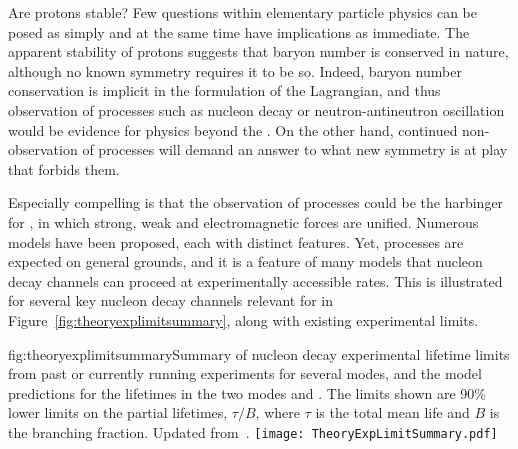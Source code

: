 Are protons %
stable? Few questions within elementary 
particle physics can be posed as simply and at the same time 
have implications as immediate.  The 
apparent stability of protons suggests that baryon number 
is conserved in nature, although no known symmetry 
requires it to be so.  Indeed, baryon number conservation is 
implicit in the formulation of the  Lagrangian, and 
thus observation of  processes such 
as nucleon decay or neutron-antineutron oscillation 
would be evidence for physics beyond the .
On the other hand, continued non-observation of  processes will 
demand an answer to what new symmetry is at play that forbids 
them.
 
Especially compelling is that the observation of  processes 
could be the harbinger for , in which strong, weak and 
electromagnetic forces are unified.  Numerous  models 
have been proposed, each with distinct features.  Yet,  processes 
are expected on general grounds, and it is a feature of many models 
that nucleon decay channels can proceed at experimentally 
accessible rates.  This is illustrated for several key nucleon 
decay channels relevant for  in 
Figure~\ref{fig:theoryexplimitsummary}, along with existing 
experimental limits.

\begin{dunefigure}{fig:theoryexplimitsummary}{Summary of nucleon decay experimental lifetime limits from past or currently running experiments for several modes, and the model predictions for the lifetimes in the two modes \ptoepizero and \ptoknubar.  The limits shown are 90\%  lower limits on the partial lifetimes, $\tau/B$, where $\tau$ is the total mean life and $B$ is the branching fraction. Updated from~\cite{Babu:2013jba}.}
\texttt{[image: TheoryExpLimitSummary.pdf]}
\end{dunefigure}

